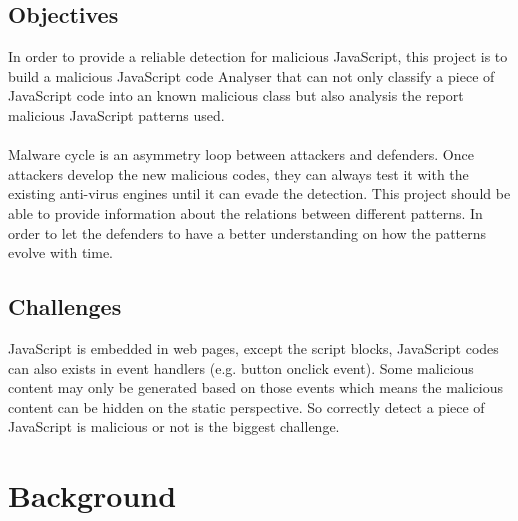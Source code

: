 \documentclass[11pt]{article}
\begin{document}
\subsection{Objectives}
In order to provide a reliable detection for malicious JavaScript, this project is to build a malicious JavaScript code Analyser that can not only classify a piece of JavaScript code into an known malicious class but also analysis the report malicious JavaScript patterns used. \\ \\
Malware cycle is an asymmetry loop between attackers and defenders. Once attackers develop the new malicious codes, they can always test it with the existing anti-virus engines until it can evade the detection. This project should be able to provide information about the relations between different patterns. In order to let the defenders to have a better understanding on how the patterns evolve with time. 
\subsection{Challenges}
JavaScript is embedded in web pages, except the script blocks, JavaScript codes can also exists in event handlers (e.g. button onclick event). Some malicious content may only be generated based on those events which means the malicious content can be hidden on the static perspective. So correctly detect a piece of JavaScript is malicious or not is the biggest challenge.
\newpage
\section{Background}
\end{document}
